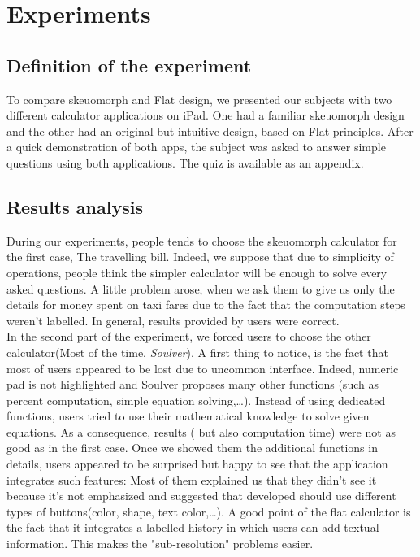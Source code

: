 \documentclass[a4paper,11pt] {article}
\theoremstyle{definition}
\begin{document}
\section{Experiments}
\label{sct:experiment}

    \subsection{Definition of the experiment}

    To compare skeuomorph and Flat design, we presented our subjects with two different calculator applications on iPad. One had a familiar skeuomorph design and the other had an original but intuitive design, based on Flat principles. After a quick demonstration of both apps, the subject was asked to answer simple questions using both applications. The quiz is available as an appendix.\\


    \subsection{Results analysis}

    During our experiments, people tends to choose the skeuomorph calculator for the first case, The travelling bill. Indeed, we suppose that due to simplicity of operations, people think the simpler calculator will be enough to solve every asked questions. A little problem arose, when we ask them to give us only the details for money spent on taxi fares due to the fact that the computation steps weren't labelled. In general, results provided by users were correct.\\

    In the second part of the experiment, we forced users to choose the other calculator(Most of the time, \textit{Soulver}). A first thing to notice, is the fact that most of users appeared to be lost due to uncommon interface. Indeed, numeric pad is not highlighted and Soulver proposes many other functions (such as percent computation, simple equation solving,\ldots). Instead of using dedicated functions, users tried to use their mathematical knowledge to solve given equations. As a consequence, results ( but also computation time) were not as good as in the first case. Once we showed them the additional functions in details, users appeared to be surprised but happy to see that the application integrates such features: Most of them explained us that they didn't see it because it's not emphasized and suggested that developed should use different types of buttons(color, shape, text color,\ldots). A good point of the flat calculator is the fact that it integrates a labelled history in which users can add textual information. This makes the "sub-resolution" problems easier.\\
\end{document}
